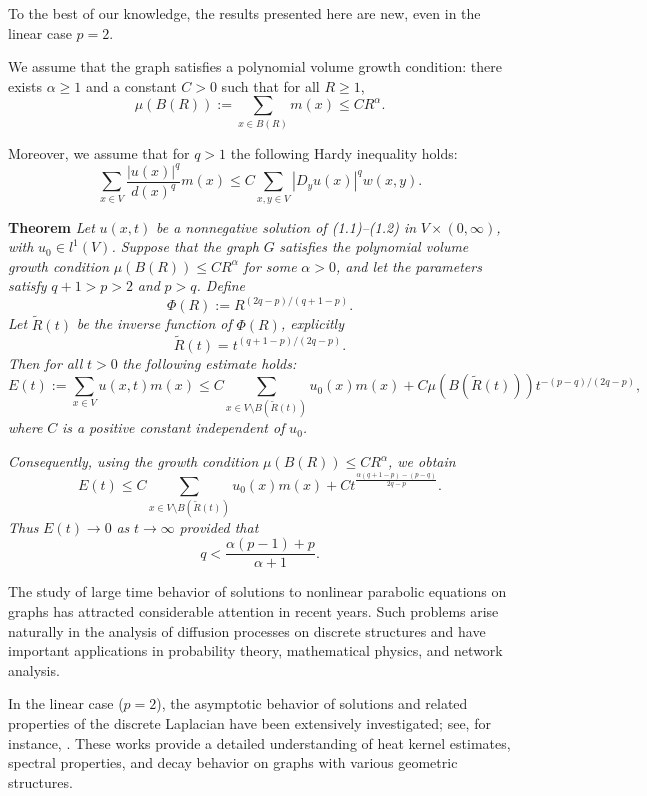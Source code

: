 \documentclass{article}
\begin{document}
	To the best of our knowledge, the results presented here are new, even in the linear case $p=2$.
	
	We assume that the graph satisfies a polynomial volume growth condition: there exists $\alpha\geq 1$ and a constant $C>0$ such that for all $R\geq 1$,
	\[
	\mu(B(R)):=\sum_{x\in B(R)}m(x)\leq C R^{\alpha}. \tag{1.4}
	\]
	
	Moreover, we assume that for $q>1$ the following Hardy inequality holds:
	\begin{equation*}
		\sum_{x\in V}\frac{|u(x)|^q}{d(x)^q} m(x)
		\le C \sum_{x,y\in V} |D_y u(x)|^q w(x,y).
	\end{equation*}
	
	
	
	
	\textbf{Theorem} \textit{Let }$u(x,t)$\textit{ be a nonnegative solution of (1.1)--(1.2) in }$V\times(0,\infty)$\textit{, with }$u_{0}\in l^{1}(V)$\textit{. Suppose that the graph }$G$\textit{ satisfies the polynomial volume growth condition }$\mu(B(R))\leq C R^{\alpha}$\textit{ for some }$\alpha>0$\textit{, and let the parameters satisfy }$q+1>p>2$\textit{ and }$p>q$\textit{. Define}
	\[
	\Phi(R):=R^{(2q-p)/(q+1-p)}.
	\]
	\textit{Let }$\widetilde{R}(t)$\textit{ be the inverse function of }$\Phi(R)$\textit{, explicitly}
	\[
	\widetilde{R}(t)=t^{(q+1-p)/(2q-p)}.
	\]
	\textit{Then for all }$t>0$\textit{ the following estimate holds:}
	\[
	E(t):=\sum_{x\in V}u(x,t)m(x)\leq C\sum_{x\in V\setminus B(\widetilde{R}(t))}u_{0}(x)m(x)+C\mu(B(\widetilde{R}(t)))t^{-(p-q)/(2q-p)},
	\]
	\textit{where }$C$\textit{ is a positive constant independent of }$u_{0}$\textit{.}
	
	\textit{Consequently, using the growth condition }$\mu(B(R))\leq C R^{\alpha}$\textit{, we obtain}
	\[
	E(t)\leq C\sum_{x\in V\setminus B(\widetilde{R}(t))}u_{0}(x)m(x)+C t^{\frac{\alpha(q+1-p)-(p-q)}{2q-p}}.
	\]
	\textit{Thus }$E(t)\to 0$\textit{ as }$t\to\infty$\textit{ provided that}
	\[
	q<\frac{\alpha(p-1)+p}{\alpha+1}.
	\]
	
	\medskip
	
	The study of large time behavior of solutions to nonlinear parabolic equations on graphs has attracted considerable attention in recent years. Such problems arise naturally in the analysis of diffusion processes on discrete structures and have important applications in probability theory, mathematical physics, and network analysis.
	
	In the linear case ($p=2$), the asymptotic behavior of solutions and related properties of the discrete Laplacian have been extensively investigated; see, for instance, \cite{keller2010, grigoryan, chung, coulhon}. These works provide a detailed understanding of heat kernel estimates, spectral properties, and decay behavior on graphs with various geometric structures.
	
\end{document}
